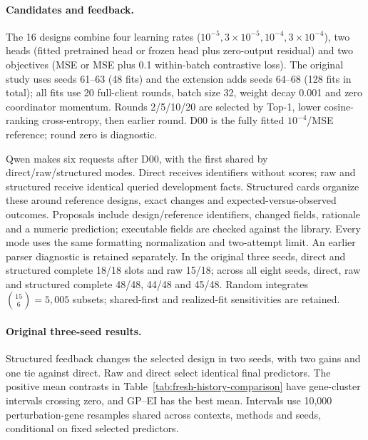 \paragraph{Candidates and feedback.}
The 16 designs combine four learning rates ($10^{-5},3\times10^{-5},10^{-4},3\times10^{-4}$), two heads (fitted pretrained head or frozen head plus zero-output residual) and two objectives (MSE or MSE plus 0.1 within-batch contrastive loss). The original study uses seeds 61--63 (48 fits) and the extension adds seeds 64--68 (128 fits in total); all fits use 20 full-client rounds, batch size 32, weight decay 0.001 and zero coordinator momentum. Rounds 2/5/10/20 are selected by Top-1, lower cosine-ranking cross-entropy, then earlier round. D00 is the fully fitted $10^{-4}$/MSE reference; round zero is diagnostic.

Qwen makes six requests after D00, with the first shared by direct/raw/structured modes. Direct receives identifiers without scores; raw and structured receive identical queried development facts. Structured cards organize these around reference designs, exact changes and expected-versus-observed outcomes. Proposals include design/reference identifiers, changed fields, rationale and a numeric prediction; executable fields are checked against the library. Every mode uses the same formatting normalization and two-attempt limit. An earlier parser diagnostic is retained separately. In the original three seeds, direct and structured complete 18/18 slots and raw 15/18; across all eight seeds, direct, raw and structured complete 48/48, 44/48 and 45/48. Random integrates $\binom{15}{6}=5,005$ subsets; shared-first and realized-fit sensitivities are retained.




\paragraph{Original three-seed results.}
Structured feedback changes the selected design in two seeds, with two gains and one tie against direct. Raw and direct select identical final predictors. The positive mean contrasts in Table~\ref{tab:fresh-history-comparison} have gene-cluster intervals crossing zero, and GP--EI has the best mean. Intervals use 10,000 perturbation-gene resamples shared across contexts, methods and seeds, conditional on fixed selected predictors.

